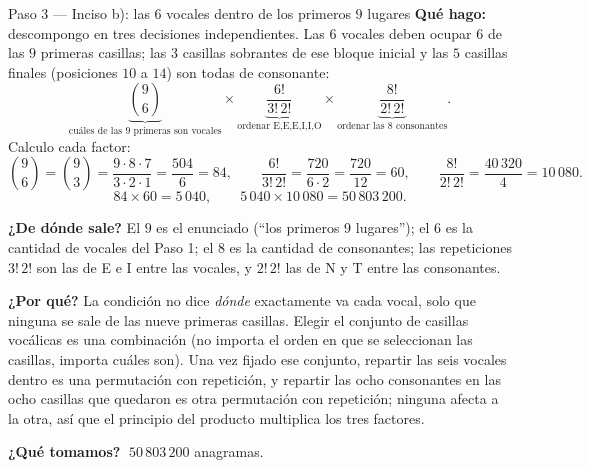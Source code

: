 \documentclass[11pt]{article}
\begin{document}
\begin{paso}{Paso 3 --- Inciso b): las 6 vocales dentro de los primeros 9 lugares}
\textbf{Qué hago:} descompongo en tres decisiones independientes. Las $6$ vocales deben ocupar $6$ de las
$9$ primeras casillas; las $3$ casillas sobrantes de ese bloque inicial y las $5$ casillas finales
(posiciones $10$ a $14$) son todas de consonante:
\[
\underbrace{\binom{9}{6}}_{\text{cuáles de las 9 primeras son vocales}}\times
\underbrace{\frac{6!}{3!\,2!}}_{\text{ordenar E,E,E,I,I,O}}\times
\underbrace{\frac{8!}{2!\,2!}}_{\text{ordenar las 8 consonantes}} .
\]
Calculo cada factor:
\[
\binom{9}{6}=\binom{9}{3}=\frac{9\cdot 8\cdot 7}{3\cdot 2\cdot 1}=\frac{504}{6}=84,\qquad
\frac{6!}{3!\,2!}=\frac{720}{6\cdot 2}=\frac{720}{12}=60,\qquad
\frac{8!}{2!\,2!}=\frac{40\,320}{4}=10\,080 .
\]
\[
84\times 60=5\,040,\qquad 5\,040\times 10\,080=50\,803\,200 .
\]

\textbf{¿De dónde sale?} El $9$ es el enunciado (``los primeros 9 lugares''); el $6$ es la cantidad de
vocales del Paso 1; el $8$ es la cantidad de consonantes; las repeticiones $3!\,2!$ son las de E e I entre
las vocales, y $2!\,2!$ las de N y T entre las consonantes.

\textbf{¿Por qué?} La condición no dice \emph{dónde} exactamente va cada vocal, solo que ninguna se sale
de las nueve primeras casillas. Elegir el conjunto de casillas vocálicas es una combinación (no importa el
orden en que se seleccionan las casillas, importa cuáles son). Una vez fijado ese conjunto, repartir las
seis vocales dentro es una permutación con repetición, y repartir las ocho consonantes en las ocho
casillas que quedaron es otra permutación con repetición; ninguna afecta a la otra, así que el principio
del producto multiplica los tres factores.

\textbf{¿Qué tomamos?} $\;50\,803\,200$ anagramas.
\end{paso}
\end{document}
